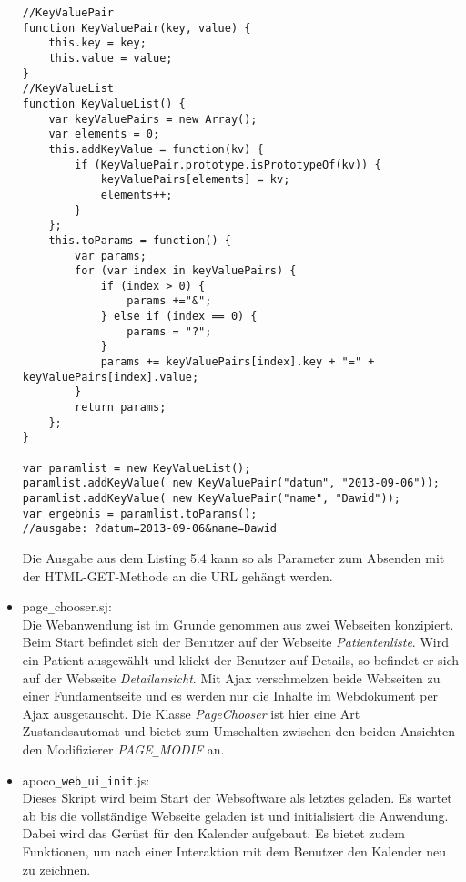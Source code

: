 \begin{itemize}
\begin{lstlisting}[caption={handleResponse Funktion zum Abfangen von Serverantworten}]
//KeyValuePair
function KeyValuePair(key, value) {    
    this.key = key;
    this.value = value; 
}
//KeyValueList
function KeyValueList() {    
    var keyValuePairs = new Array();
    var elements = 0;   
    this.addKeyValue = function(kv) {     
        if (KeyValuePair.prototype.isPrototypeOf(kv)) {            
            keyValuePairs[elements] = kv;
            elements++;           
        }
    };   
    this.toParams = function() {        
        var params;
        for (var index in keyValuePairs) {            
            if (index > 0) {                
                params +="&";
            } else if (index == 0) {                
                params = "?";
            }
            params += keyValuePairs[index].key + "=" + keyValuePairs[index].value;
        }    
        return params;
    };    
}

var paramlist = new KeyValueList();
paramlist.addKeyValue( new KeyValuePair("datum", "2013-09-06"));
paramlist.addKeyValue( new KeyValuePair("name", "Dawid"));
var ergebnis = paramlist.toParams();
//ausgabe: ?datum=2013-09-06&name=Dawid
\end{lstlisting}
 
 Die Ausgabe aus dem Listing 5.4 kann so als Parameter zum Absenden mit der HTML-GET-Methode an die URL geh\"angt werden.
 
 \item page\texttt{\_}chooser.sj:\\
 Die Webanwendung ist im Grunde genommen aus zwei Webseiten konzipiert.
 Beim Start befindet sich der Benutzer auf der Webseite \emph{Patientenliste}.
 Wird ein Patient ausgew\"ahlt und klickt der Benutzer auf Details, 
 so befindet er sich auf der Webseite \emph{Detailansicht}.
 Mit Ajax verschmelzen beide Webseiten zu einer Fundamentseite und es werden nur die Inhalte 
 im Webdokument per Ajax ausgetauscht.
 Die Klasse \emph{PageChooser} ist hier eine Art Zustandsautomat und bietet zum Umschalten 
 zwischen den beiden Ansichten den Modifizierer \emph{PAGE\texttt{\_}MODIF} an.

 \item apoco\texttt{\_web\_ui\_init}.js:\\
 Dieses Skript wird beim Start der Websoftware als letztes geladen.
 Es wartet ab bis die vollst\"andige Webseite geladen ist und initialisiert die Anwendung.
 Dabei wird das Ger\"ust f\"ur den Kalender aufgebaut.
 Es bietet zudem Funktionen, um nach einer Interaktion mit dem Benutzer den Kalender neu zu zeichnen.
\end{itemize}



